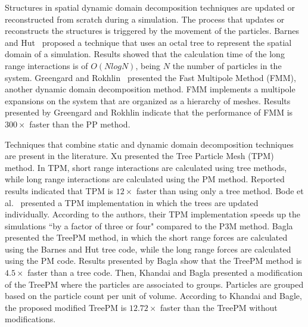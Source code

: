 \documentclass[runningheads]{llncs}
\begin{document}
Structures in spatial dynamic domain decomposition techniques are updated or reconstructed from scratch during a simulation. 
The process that updates or reconstructs the structures is triggered by the movement of the particles. Barnes and Hut~\cite{barnes1986hierarchical} proposed a technique that uses an octal tree to represent the spatial domain of a simulation. Results showed that the calculation time of the long range interactions is of $O(N log N)$, being $N$ the number of particles in the system. Greengard and Rokhlin~\cite{greengard1987fast} presented the Fast Multipole Method (FMM), another dynamic domain decomposition method. FMM implements a multipole expansions on the system that are organized as a hierarchy of meshes. Results presented by Greengard and Rokhlin indicate that the performance of FMM is $300\times$ faster than the PP method.

Techniques that combine static and dynamic domain decomposition techniques are present in the literature. Xu \cite{xu1994new} presented the Tree Particle Mesh (TPM) method. In TPM, short range interactions are calculated using tree methods, while long range interactions are calculated using the PM method. Reported results indicated that TPM is $12\times$ faster than using only a tree method. Bode et al.~\cite{bode2000tree} presented a TPM implementation in which the trees are updated individually. According to the authors, their TPM implementation speeds up the simulations ``by a factor of three or four" compared to the P3M method. Bagla \cite{bagla2002treepm} presented the TreePM method, in which the short range forces are calculated using the Barnes and Hut tree code, while the long range forces are calculated using the PM code. Results presented by Bagla show that the TreePM method is $4.5\times$ faster than a tree code. Then, Khandai and Bagla \cite{khandai2009modified} presented a modification of the TreePM where the particles are associated to groups. Particles are grouped based on the particle count per unit of volume. According to Khandai and Bagle, the proposed modified TreePM is $12.72\times$ faster than the TreePM without modifications.   
\end{document}
